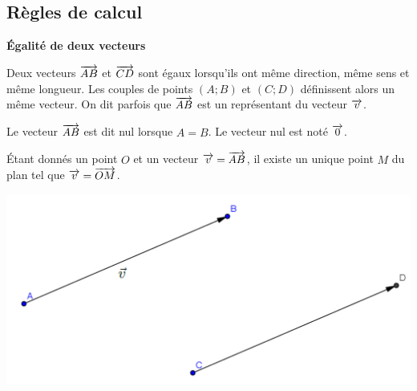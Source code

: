 \documentclass[10pt,oneside]{article}
\begin{document}
\subsection{Règles de calcul}
\begin{minipage}[c]{.7\linewidth}
\begin{propo}
\textbf{Égalité de deux vecteurs}

Deux vecteurs $\overrightarrow{AB}$ et $\overrightarrow{CD}$  sont égaux lorsqu'ils ont même direction, même sens et même longueur. Les
couples de points $(A;B)$ et $(C;D)$ définissent alors un même vecteur. On dit parfois que $\overrightarrow{AB}$ est un représentant du vecteur $\overrightarrow{v}$.

Le vecteur $\overrightarrow{AB}$ est dit nul lorsque $A = B$. Le vecteur
nul est noté $\overrightarrow{0}$.

Étant donnés un point $O$ et un vecteur $\overrightarrow{v} = \overrightarrow{AB}$, il existe un unique point $M$ du plan tel que $\overrightarrow{v} = \overrightarrow{OM}$.

\end{propo}

\end{minipage}\hfill
\begin{minipage}[c]{.28\linewidth}
\begin{center}
\includegraphics[width=.95\textwidth]{png/vecteur}
\end{center}
\end{minipage}
\end{document}
